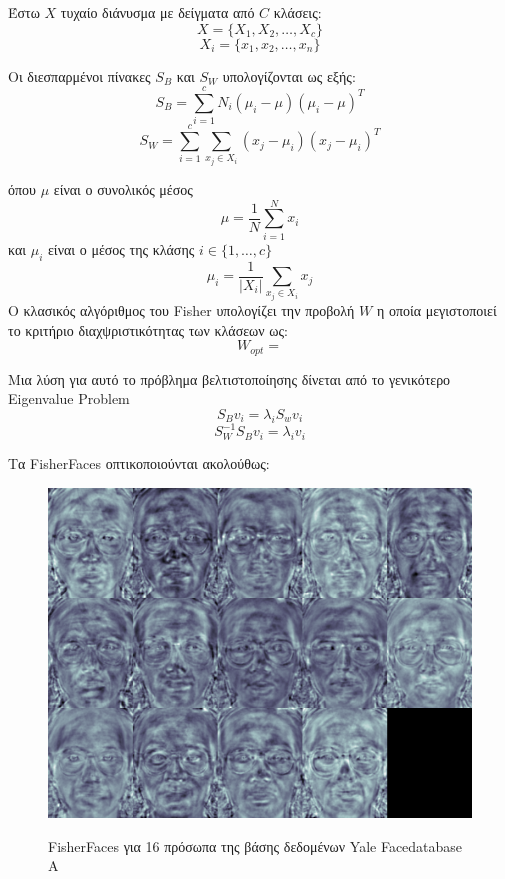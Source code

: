 Έστω $X$ τυχαίο διάνυσμα με δείγματα από $C$ κλάσεις:
$$
X = \{X_1,X_2,\ldots,X_c\}
$$
$$
X_i = \{x_1,x_2,\ldots,x_n\}
$$

Οι διεσπαρμένοι πίνακες $S_B$ και $S_W$ υπολογίζονται ως εξής:
$$
S_B = \sum_{i=1}^{c} N_i(\mu_i-\mu)(\mu_i-\mu)^{T}
$$
$$
S_W = \sum_{i=1}^{c} \sum_{x_j \in X_i}^{} (x_j-\mu_i)(x_j-\mu_i)^{T}
$$

όπου $\mu$ είναι ο συνολικός μέσος
$$
\mu = \frac{1}{N}\sum_{i=1}^{N} x_i
$$
και $\mu_i$ είναι ο μέσος της κλάσης $i \in \{1,\ldots,c\}$
$$
\mu_i = \frac{1}{|X_i|}\sum_{x_j \in X_i} x_j
$$
Ο κλασικός αλγόριθμος του Fisher υπολογίζει την προβολή $W$ η οποία μεγιστοποιεί
το κριτήριο διαχψριστικότητας των κλάσεων ως:
$$
W_{opt} =
$$

Μια λύση για αυτό το πρόβλημα βελτιστοποίησης δίνεται από το γενικότερο Eigenvalue
Problem ~\cite{}
$$
S_{B}v_i = \lambda_{i}S_{w}v_i
$$
$$
S_{W}^{-1}S_{B}v_i = \lambda_{i}v_i
$$

Τα FisherFaces οπτικοποιούνται ακολούθως:


\begin{figure}[htbp]
  \begin{center}
    \includegraphics[width=0.5\maxwidth]{../figures/fisherfaces.png}
      \caption{FisherFaces για 16 πρόσωπα της βάσης δεδομένων Yale Facedatabase A}
      \label{fig:fisherfaces}
   \end{center}
\end{figure}

